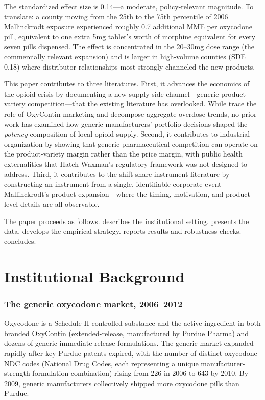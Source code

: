 \documentclass[12pt]{article}
\begin{document}
The standardized effect size is 0.14---a moderate, policy-relevant magnitude. To translate: a county moving from the 25th to the 75th percentile of 2006 Mallinckrodt exposure experienced roughly 0.7 additional MME per oxycodone pill, equivalent to one extra 5mg tablet's worth of morphine equivalent for every seven pills dispensed. The effect is concentrated in the 20--30mg dose range (the commercially relevant expansion) and is larger in high-volume counties (SDE = 0.18) where distributor relationships most strongly channeled the new products.

This paper contributes to three literatures. First, it advances the economics of the opioid crisis by documenting a new supply-side channel---generic product variety competition---that the existing literature has overlooked. While \citet{alpert2022origins} trace the role of OxyContin marketing and \citet{ruhm2019drivers} decompose aggregate overdose trends, no prior work has examined how generic manufacturers' portfolio decisions shaped the \emph{potency} composition of local opioid supply. Second, it contributes to industrial organization by showing that generic pharmaceutical competition can operate on the product-variety margin rather than the price margin, with public health externalities that Hatch-Waxman's regulatory framework was not designed to address. Third, it contributes to the shift-share instrument literature \citep{borusyak2022quasi, goldsmith2020bartik} by constructing an instrument from a single, identifiable corporate event---Mallinckrodt's product expansion---where the timing, motivation, and product-level details are all observable.

The paper proceeds as follows.  describes the institutional setting.  presents the data.  develops the empirical strategy.  reports results and robustness checks.  concludes.


\section{Institutional Background}
\label{sec:background}

\subsubsection*{The generic oxycodone market, 2006--2012} Oxycodone is a Schedule II controlled substance and the active ingredient in both branded OxyContin (extended-release, manufactured by Purdue Pharma) and dozens of generic immediate-release formulations. The generic market expanded rapidly after key Purdue patents expired, with the number of distinct oxycodone NDC codes (National Drug Codes, each representing a unique manufacturer-strength-formulation combination) rising from 226 in 2006 to 643 by 2010. By 2009, generic manufacturers collectively shipped more oxycodone pills than Purdue.
\end{document}
